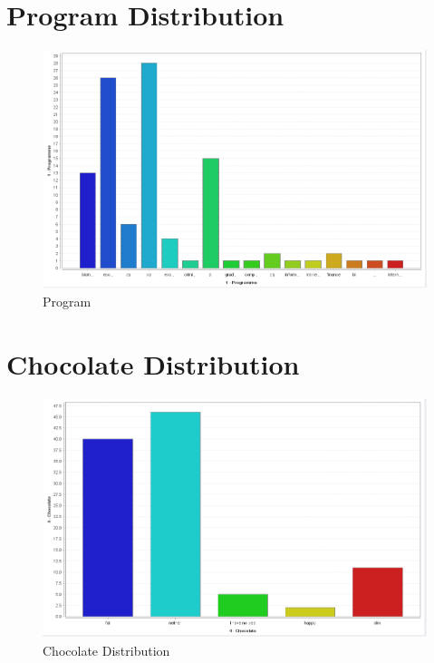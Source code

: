 \documentclass{vldb}
\begin{document}
\begin{appendices}
\onecolumn
\section{Program Distribution}\label{program}
		\begin{figure}[h]
			\centering
			\includegraphics[scale=0.4]{1.png}
			\caption{Program}
			\label{fig2}
		\end{figure}
\section{Chocolate Distribution}\label{chocolate}
		\begin{figure}[h]
			\centering
			\includegraphics[scale=0.4]{2.png}
			\caption{Chocolate Distribution}
			\label{fig3}
		\end{figure}

\end{appendices}
\end{document}
